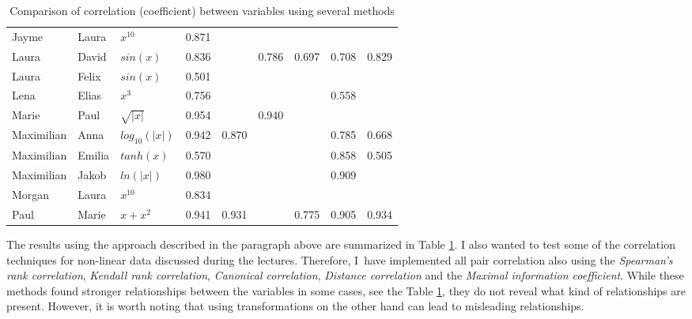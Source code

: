 \documentclass[a4paper,10pt]{article}\setlength{\textheight}{10in}\setlength{\textwidth}{6.5in}\setlength{\topmargin}{-0.125in}\setlength{\oddsidemargin}{-.2in}\setlength{\evensidemargin}{-.2in}\setlength{\headsep}{0.2in}\setlength{\footskip}{0pt}\usepackage{amsmath}\usepackage{fancyhdr}\usepackage{enumitem}\usepackage{hyperref}\usepackage{xcolor}\usepackage{graphicx}\pagestyle{fancy}
\begin{document}
\begin{enumerate}[topsep=0mm, partopsep=0mm, leftmargin=*]
\begin{table}[ht!]
\begin{tabular}{|l|l|l|r|r|r|r|r|r|}
     Jayme &      Laura &                               $x ^{10}$ &  0.871 &            &           &          &       &  ~    \\[0.15cm]
     Laura &      David &                                    $sin(x)$ &  0.836 &            &     0.786 &    0.697 & 0.708 & 0.829 \\[0.15cm]
     Laura &      Felix &                                    $sin(x)$ &  0.501 &            &     ~ &    ~ &       & ~ \\[0.15cm]
      Lena &      Elias &                                 $x ^ 3$ &  0.756 &            &           &          & 0.558 &  ~    \\[0.15cm]
     Marie &       Paul &  $\sqrt{|x|}$ &  0.954 &            &     0.940 &          &       & ~     \\[0.15cm]
Maximilian &       Anna & $log_{10}(|x|)$ &  0.942 &      0.870 &           &          & 0.785 & 0.668 \\[0.15cm]
Maximilian &     Emilia &                      $tanh(x)$ &  0.570 &            &     ~ &    ~ & 0.858 & 0.505 \\[0.15cm]
Maximilian &      Jakob & $ln(|x|)$ &  0.980 &            &           &          & 0.909 & ~     \\[0.15cm]
    Morgan &      Laura &                               $x ^{10}$ &  0.834 &            &           &          &       & ~     \\[0.15cm]
      Paul &      Marie &                             $x + x ^ 2$ &  0.941 &      0.931 &           &    0.775 & 0.905 & 0.934 \\[0.15cm]
\hline
\end{tabular}
\caption{Comparison of correlation (coefficient) between variables using several methods}
\label{tab:corr_transformation_table}
\end{table}

The results using the approach described in the paragraph above are summarized in Table \ref{tab:corr_transformation_table}. I also wanted to test some of the correlation techniques for non-linear data discussed during the lectures. Therefore, I~have implemented all pair correlation also using the \textit{Spearman's rank correlation}, \textit{Kendall rank correlation}, \textit{Canonical correlation}, \textit{Distance correlation} and the \textit{Maximal information coefficient}. While these methods found stronger relationships between the variables in some cases, see the Table \ref{tab:corr_transformation_table}, they do not reveal what kind of relationships are present. However, it is worth noting that using transformations on the other hand can lead to misleading relationships. 


\end{enumerate}
\end{document}
